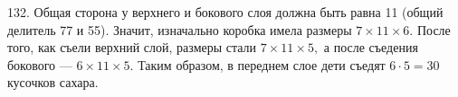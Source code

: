 132. Общая сторона у верхнего и бокового слоя должна быть равна 11 (общий делитель 77 и 55). Значит, изначально коробка имела размеры $7\times11\times6.$ После того, как съели верхний слой, размеры стали $7\times11\times5,$ а после съедения бокового --- $6\times11\times5.$ Таким образом, в переднем слое дети съедят $6\cdot5=30$ кусочков сахара.\\
